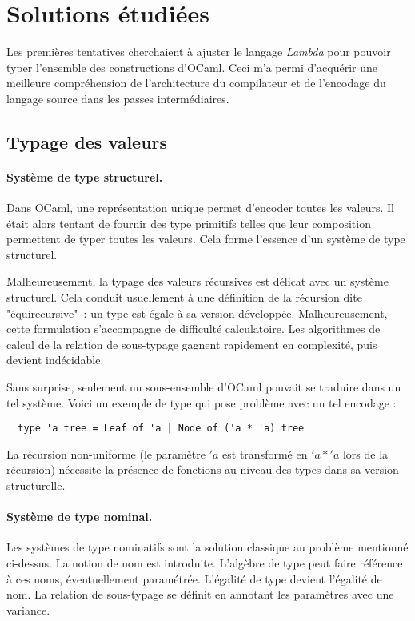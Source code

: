 \section{Solutions étudiées}

Les premières tentatives cherchaient à ajuster le langage \emph{Lambda} pour
pouvoir typer l'ensemble des constructions d'OCaml. Ceci m'a permi d'acquérir
une meilleure compréhension de l'architecture du compilateur et de l'encodage du
langage source dans les passes intermédiaires.

\subsection{Typage des valeurs}

\paragraph{Système de type structurel.}
Dans OCaml, une représentation unique permet d'encoder toutes les valeurs. Il
était alors tentant de fournir des type primitifs telles que leur composition
permettent de typer toutes les valeurs. Cela forme l'essence d'un système de
type structurel. 

Malheureusement, la typage des valeurs récursives est délicat avec un système
structurel. Cela conduit usuellement à une définition de la récursion dite
"équirecursive" : un type est égale à sa version développée. Malheureusement,
cette formulation s'accompagne de difficulté calculatoire. Les algorithmes de
calcul de la relation de sous-typage gagnent rapidement en complexité, puis
devient indécidable.

Sans surprise, seulement un sous-ensemble d'OCaml pouvait se traduire dans un
tel système. Voici un exemple de type qui pose problème avec un tel encodage :

\begin{lstlisting}
  type 'a tree = Leaf of 'a | Node of ('a * 'a) tree
\end{lstlisting}

La récursion non-uniforme (le paramètre $'a$ est transformé en $'a * 'a$ lors de
la récursion) nécessite la présence de fonctions au niveau des types dans sa
version structurelle.

\paragraph{Système de type nominal.} 
Les systèmes de type nominatifs sont la solution classique au problème mentionné
ci-dessus.  La notion de nom est introduite.  L'algèbre de type peut faire
référence à ces noms, éventuellement paramétrée.  L'égalité de type devient
l'égalité de nom.  La relation de sous-typage se définit en annotant les
paramètres avec une variance.

